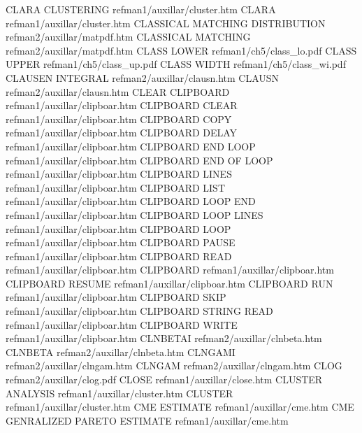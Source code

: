 CLARA CLUSTERING                        refman1/auxillar/cluster.htm
CLARA                                   refman1/auxillar/cluster.htm
CLASSICAL MATCHING DISTRIBUTION         refman2/auxillar/matpdf.htm
CLASSICAL MATCHING                      refman2/auxillar/matpdf.htm
CLASS LOWER                             refman1/ch5/class_lo.pdf
CLASS UPPER                             refman1/ch5/class_up.pdf
CLASS WIDTH                             refman1/ch5/class_wi.pdf
CLAUSEN INTEGRAL                        refman2/auxillar/clausn.htm
CLAUSN                                  refman2/auxillar/clausn.htm
CLEAR CLIPBOARD                         refman1/auxillar/clipboar.htm
CLIPBOARD CLEAR                         refman1/auxillar/clipboar.htm
CLIPBOARD COPY                          refman1/auxillar/clipboar.htm
CLIPBOARD DELAY                         refman1/auxillar/clipboar.htm
CLIPBOARD END LOOP                      refman1/auxillar/clipboar.htm
CLIPBOARD END OF LOOP                   refman1/auxillar/clipboar.htm
CLIPBOARD LINES                         refman1/auxillar/clipboar.htm
CLIPBOARD LIST                          refman1/auxillar/clipboar.htm
CLIPBOARD LOOP END                      refman1/auxillar/clipboar.htm
CLIPBOARD LOOP LINES                    refman1/auxillar/clipboar.htm
CLIPBOARD LOOP                          refman1/auxillar/clipboar.htm
CLIPBOARD PAUSE                         refman1/auxillar/clipboar.htm
CLIPBOARD READ                          refman1/auxillar/clipboar.htm
CLIPBOARD                               refman1/auxillar/clipboar.htm
CLIPBOARD RESUME                        refman1/auxillar/clipboar.htm
CLIPBOARD RUN                           refman1/auxillar/clipboar.htm
CLIPBOARD SKIP                          refman1/auxillar/clipboar.htm
CLIPBOARD STRING READ                   refman1/auxillar/clipboar.htm
CLIPBOARD WRITE                         refman1/auxillar/clipboar.htm
CLNBETAI                                refman2/auxillar/clnbeta.htm
CLNBETA                                 refman2/auxillar/clnbeta.htm
CLNGAMI                                 refman2/auxillar/clngam.htm
CLNGAM                                  refman2/auxillar/clngam.htm
CLOG                                    refman2/auxillar/clog.pdf
CLOSE                                   refman1/auxillar/close.htm
CLUSTER ANALYSIS                        refman1/auxillar/cluster.htm
CLUSTER                                 refman1/auxillar/cluster.htm
CME ESTIMATE                            refman1/auxillar/cme.htm
CME GENRALIZED PARETO ESTIMATE          refman1/auxillar/cme.htm
